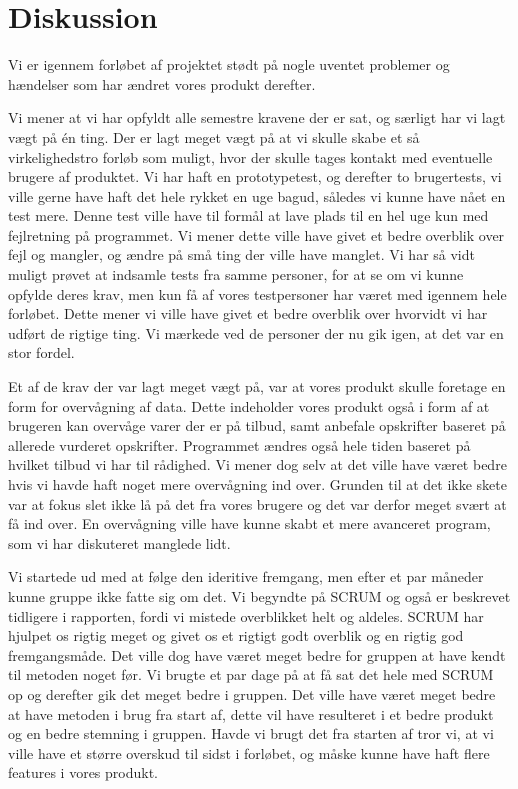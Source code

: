 \chapter{Diskussion}
Vi er igennem forløbet af projektet stødt på nogle uventet problemer og hændelser som har ændret vores produkt derefter.


Vi mener at vi har opfyldt alle semestre kravene der er sat, og særligt har vi lagt vægt på én ting.
Der er lagt meget vægt på at vi skulle skabe et så virkelighedstro forløb som muligt, hvor der skulle tages kontakt med eventuelle brugere af produktet.
Vi har haft en prototypetest, og derefter to brugertests, vi ville gerne have haft det hele rykket en uge bagud, således vi kunne have nået en test mere.
Denne test ville have til formål at lave plads til en hel uge kun med fejlretning på programmet.
Vi mener dette ville have givet et bedre overblik over fejl og mangler, og ændre på små ting der ville have manglet.
Vi har så vidt muligt prøvet at indsamle tests fra samme personer, for at se om vi kunne opfylde deres krav, men kun få af vores testpersoner har været med igennem hele forløbet.
Dette mener vi ville have givet et bedre overblik over hvorvidt vi har udført de rigtige ting.
Vi mærkede ved de personer der nu gik igen, at det var en stor fordel.


Et af de krav der var lagt meget vægt på, var at vores produkt skulle foretage en form for overvågning af data.
Dette indeholder vores produkt også i form af at brugeren kan overvåge varer der er på tilbud, samt anbefale opskrifter baseret på allerede vurderet opskrifter.
Programmet ændres også hele tiden baseret på hvilket tilbud vi har til rådighed.
Vi mener dog selv at det ville have været bedre hvis vi havde haft noget mere overvågning ind over.
Grunden til at det ikke skete var at fokus slet ikke lå på det fra vores brugere og det var derfor meget svært at få ind over.
En overvågning ville have kunne skabt et mere avanceret program, som vi har diskuteret manglede lidt.

Vi startede ud med at følge den ideritive fremgang, men efter et par måneder kunne gruppe ikke fatte sig om det.
Vi begyndte på SCRUM og også er beskrevet tidligere i rapporten, fordi vi mistede overblikket helt og aldeles.
SCRUM har hjulpet os rigtig meget og givet os et rigtigt godt overblik og en rigtig god fremgangsmåde.
Det ville dog have været meget bedre for gruppen at have kendt til metoden noget før.
Vi brugte et par dage på at få sat det hele med SCRUM op og derefter gik det meget bedre i gruppen.
Det ville have været meget bedre at have metoden i brug fra start af, dette vil have resulteret i et bedre produkt og en bedre stemning i gruppen.
Havde vi brugt det fra starten af tror vi, at vi ville have et større overskud til sidst i forløbet, og måske kunne have haft flere features i vores produkt.


